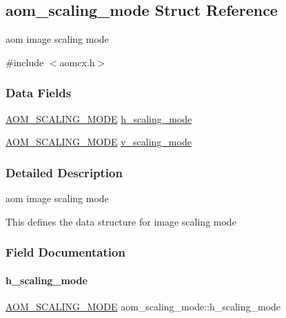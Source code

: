 \hypertarget{structaom__scaling__mode}{}\subsection{aom\+\_\+scaling\+\_\+mode Struct Reference}
\label{structaom__scaling__mode}


aom image scaling mode  




{\ttfamily \#include $<$aomcx.\+h$>$}

\subsubsection*{Data Fields}
\begin{DoxyCompactItemize}
\item 
\hyperlink{group__aom__encoder_ga6694eedd50b128415a3434404c56d73d}{A\+O\+M\+\_\+\+S\+C\+A\+L\+I\+N\+G\+\_\+\+M\+O\+DE} \hyperlink{structaom__scaling__mode_aa5ea6cc798f31d2af5e68425982f50e5}{h\+\_\+scaling\+\_\+mode}
\item 
\hyperlink{group__aom__encoder_ga6694eedd50b128415a3434404c56d73d}{A\+O\+M\+\_\+\+S\+C\+A\+L\+I\+N\+G\+\_\+\+M\+O\+DE} \hyperlink{structaom__scaling__mode_a3b535e8839e2bdf05afcd15ec6daa6ce}{v\+\_\+scaling\+\_\+mode}
\end{DoxyCompactItemize}


\subsubsection{Detailed Description}
aom image scaling mode 

This defines the data structure for image scaling mode 

\subsubsection{Field Documentation}
\mbox{\label{structaom__scaling__mode_aa5ea6cc798f31d2af5e68425982f50e5}} 
\paragraph{\texorpdfstring{h\+\_\+scaling\+\_\+mode}{h\_scaling\_mode}}
{\footnotesize\ttfamily \hyperlink{group__aom__encoder_ga6694eedd50b128415a3434404c56d73d}{A\+O\+M\+\_\+\+S\+C\+A\+L\+I\+N\+G\+\_\+\+M\+O\+DE} aom\+\_\+scaling\+\_\+mode\+::h\+\_\+scaling\+\_\+mode}

